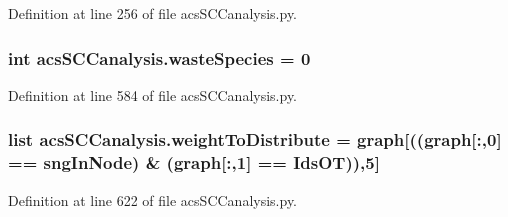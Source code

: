 Definition at line 256 of file acs\-S\-C\-Canalysis.\-py.

\hypertarget{a00096_ace0de61f3c6aa14b4197156be3a68280}{
\subsubsection[{waste\-Species}]{\setlength{\rightskip}{0pt plus 5cm}int acs\-S\-C\-Canalysis.\-waste\-Species = 0}}\label{a00096_ace0de61f3c6aa14b4197156be3a68280}


Definition at line 584 of file acs\-S\-C\-Canalysis.\-py.

\hypertarget{a00096_a5162bfbe5eb2618736d1f77bb3125a9b}{
\subsubsection[{weight\-To\-Distribute}]{\setlength{\rightskip}{0pt plus 5cm}list acs\-S\-C\-Canalysis.\-weight\-To\-Distribute = {\bf graph}\mbox{[}(({\bf graph}\mbox{[}\-:,0\mbox{]} == sng\-In\-Node) \& ({\bf graph}\mbox{[}\-:,1\mbox{]} == Ids\-O\-T)),5\mbox{]}}}\label{a00096_a5162bfbe5eb2618736d1f77bb3125a9b}


Definition at line 622 of file acs\-S\-C\-Canalysis.\-py.

